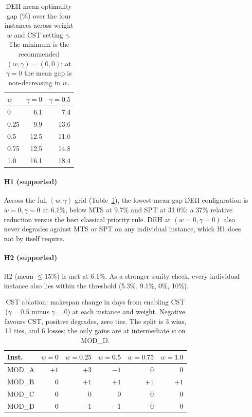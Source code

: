 \documentclass[conference]{IEEEtran}
\begin{document}
\begin{table}[t]
\caption{DEH mean optimality gap (\%) over the four instances across
weight $w$ and CST setting $\gamma$. The minimum is the recommended
$(w, \gamma) = (0, 0)$; at $\gamma = 0$ the mean gap is non-decreasing
in $w$.}
\label{tab:deh-grid}
\centering
\renewcommand{\arraystretch}{1.15}
\setlength{\tabcolsep}{8pt}
\begin{tabular}{@{}lrr@{}}
\toprule
$w$ & $\gamma = 0$ & $\gamma = 0.5$ \\
\midrule
0    &  6.1 &  7.4 \\
0.25 &  9.9 & 13.6 \\
0.5  & 12.5 & 11.0 \\
0.75 & 12.5 & 14.8 \\
1.0  & 16.1 & 18.4 \\
\bottomrule
\end{tabular}
\end{table}

\paragraph{H1 (supported)}
Across the full $(w, \gamma)$ grid (Table~\ref{tab:deh-grid}), the
lowest-mean-gap DEH configuration is $w = 0, \gamma = 0$ at 6.1\%,
below MTS at 9.7\% and SPT at 31.0\%: a 37\% relative reduction versus
the best classical priority rule. DEH at $(w=0, \gamma=0)$ also never
degrades against MTS or SPT on any individual instance, which H1 does
not by itself require.

\paragraph{H2 (supported)}
H2 (mean $\leq 15\%$) is met at 6.1\%. As a stronger sanity check,
every individual instance also lies within the threshold
(5.3\%, 9.1\%, 0\%, 10\%).

\begin{table}[t]
\caption{CST ablation: makespan change in days from enabling CST
($\gamma = 0.5$ minus $\gamma = 0$) at each instance and weight.
Negative favours CST, positive degrades, zero ties. The split is 3
wins, 11 ties, and 6 losses; the only gains are at intermediate $w$ on
MOD\_D.}
\label{tab:cst-delta}
\centering
\renewcommand{\arraystretch}{1.15}
\setlength{\tabcolsep}{6pt}
\begin{tabular}{@{}lrrrrr@{}}
\toprule
Inst.\ & $w{=}0$ & $w{=}0.25$ & $w{=}0.5$ & $w{=}0.75$ & $w{=}1.0$ \\
\midrule
MOD\_A & $+1$ & $+3$ & $-1$ & $0$ & $0$ \\
MOD\_B & $0$  & $+1$ & $+1$ & $+1$ & $+1$ \\
MOD\_C & $0$  & $0$  & $0$  & $0$  & $0$ \\
MOD\_D & $0$  & $-1$ & $-1$ & $0$  & $0$ \\
\bottomrule
\end{tabular}
\end{table}
\end{document}
